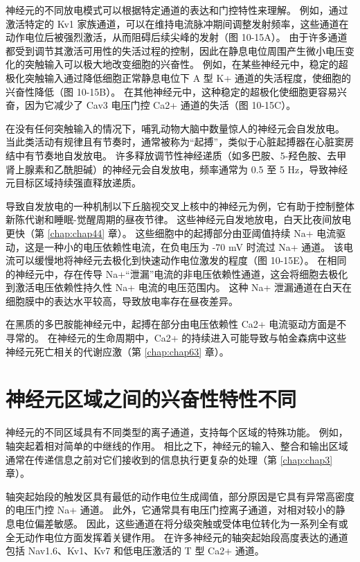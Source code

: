 神经元的不同放电模式可以根据特定通道的表达和门控特性来理解。 
例如，通过激活特定的 Kv1 家族通道，可以在维持电流脉冲期间调整发射频率，这些通道在动作电位后被强烈激活，从而阻碍后续尖峰的发射（图 10-15A）。 
由于许多通道都受到调节其激活可用性的失活过程的控制，因此在静息电位周围产生微小电压变化的突触输入可以极大地改变细胞的兴奋性。 
例如，在某些神经元中，稳定的超极化突触输入通过降低细胞正常静息电位下 A 型 K+ 通道的失活程度，使细胞的兴奋性降低（图 10-15B）。 
在其他神经元中，这种稳定的超极化使细胞更容易兴奋，因为它减少了 Cav3 电压门控 Ca2+ 通道的失活（图 10-15C）。


在没有任何突触输入的情况下，哺乳动物大脑中数量惊人的神经元会自发放电。 
当此类活动有规律且有节奏时，通常被称为“起搏”，类似于心脏起搏器在心脏窦房结中有节奏地自发放电。 
许多释放调节性神经递质（如多巴胺、5-羟色胺、去甲肾上腺素和乙酰胆碱）的神经元会自发放电，频率通常为 0.5 至 5 Hz，导致神经元目标区域持续强直释放递质。


导致自发放电的一种机制以下丘脑视交叉上核中的神经元为例，它有助于控制整体新陈代谢和睡眠-觉醒周期的昼夜节律。 
这些神经元自发地放电，白天比夜间放电更快（第 \ref{chap:chap44} 章）。 
这些细胞中的起搏部分由亚阈值持续 Na+ 电流驱动，这是一种小的电压依赖性电流，在负电压为 -70 mV 时流过 Na+ 通道。 
该电流可以缓慢地将神经元去极化到快速动作电位激发的程度（图 10-15E）。 
在相同的神经元中，存在传导 Na+“泄漏”电流的非电压依赖性通道，这会将细胞去极化到激活电压依赖性持久性 Na+ 电流的电压范围内。 
这种 Na+ 泄漏通道在白天在细胞膜中的表达水平较高，导致放电率存在昼夜差异。


在黑质的多巴胺能神经元中，起搏在部分由电压依赖性 Ca2+ 电流驱动方面是不寻常的。 
在神经元的生命周期中，Ca2+ 的持续进入可能导致与帕金森病中这些神经元死亡相关的代谢应激（第 \ref{chap:chap63} 章）。


\section{神经元区域之间的兴奋性特性不同}
神经元的不同区域具有不同类型的离子通道，支持每个区域的特殊功能。 
例如，轴突起着相对简单的中继线的作用。 
相比之下，神经元的输入、整合和输出区域通常在传递信息之前对它们接收到的信息执行更复杂的处理（第 \ref{chap:chap3}章）。


轴突起始段的触发区具有最低的动作电位生成阈值，部分原因是它具有异常高密度的电压门控 Na+ 通道。 
此外，它通常具有电压门控离子通道，对相对较小的静息电位偏差敏感。 
因此，这些通道在将分级突触或受体电位转化为一系列全有或全无动作电位方面发挥着关键作用。 
在许多神经元的轴突起始段高度表达的通道包括 Nav1.6、Kv1、Kv7 和低电压激活的 T 型 Ca2+ 通道。


